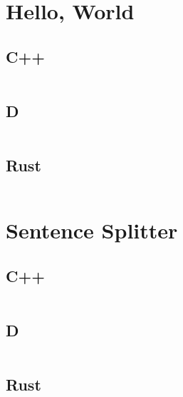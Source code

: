 \documentclass[finalcopy]{srpaper}
\begin{document}

\section{Hello, World}
\subsection{C++}
\begin{mdframed}[linecolor=black]
\inputminted{cpp}{../examples/hello-world/hello_world.cpp}
\end{mdframed}

\subsection{D}
\begin{mdframed}[linecolor=black]
\inputminted{d}{../examples/hello-world/hello_world.d}
\end{mdframed}

\subsection{Rust}
\begin{mdframed}[linecolor=black]
\inputminted{rust}{../examples/hello-world/hello_world.rs}
\end{mdframed}

\section{Sentence Splitter}
\subsection{C++}
\begin{mdframed}[linecolor=black]
\inputminted[fontsize=\scriptsize]{cpp}{../examples/sentence-splitter/sentence_splitter.cpp}
\end{mdframed}

\subsection{D}
\begin{mdframed}[linecolor=black]
\inputminted[fontsize=\scriptsize]{d}{../examples/sentence-splitter/sentence_splitter.d}
\end{mdframed}

\subsection{Rust}
\begin{mdframed}[linecolor=black]
\inputminted[fontsize=\scriptsize]{rust}{../examples/sentence-splitter/sentence_splitter.rs}
\end{mdframed}
\end{document}
